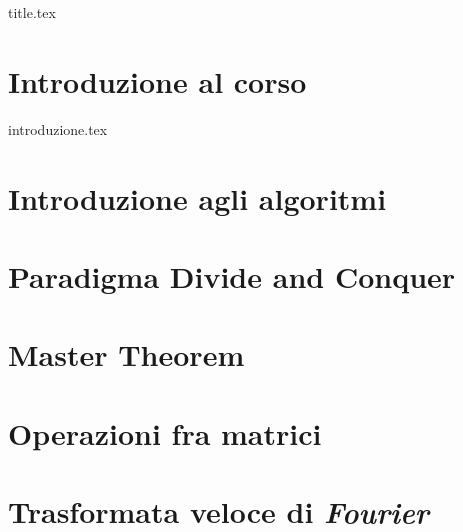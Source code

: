 \documentclass[a4paper,oneside]{book}
\theoremstyle{definition}
\theoremstyle{theorem}
\theoremstyle{theorem}
\begin{document}
\pagestyle{plain}

% 
{title.tex}


\frontmatter

\tableofcontents

\mainmatter

\pagestyle{fancy}

\chapter*{Introduzione al corso}
{introduzione.tex}





\chapter{Introduzione agli algoritmi}


\chapter{Paradigma Divide and Conquer}


\chapter{Master Theorem}


\chapter{Operazioni fra matrici}


\chapter{Trasformata veloce di \textit{Fourier}}

\end{document}
